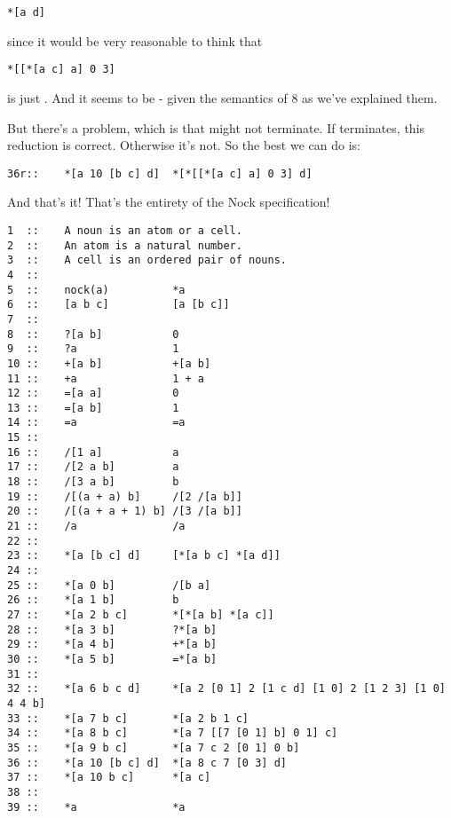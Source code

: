 \begin{framed_shaded}
\begin{Verbatim}[fontsize=\relsize{-2.5},fontseries=b,commandchars=\\\{\}]
*[a d]
\end{Verbatim}
\end{framed_shaded}
since it would be very reasonable to think that

\begin{framed_shaded}
\begin{Verbatim}[fontsize=\relsize{-2.5},fontseries=b,commandchars=\\\{\}]
*[[*[a c] a] 0 3]
\end{Verbatim}
\end{framed_shaded}

is just .  And it seems to be - given the semantics of 8 as
we've explained them.

But there's a problem, which is that  might not terminate.
If  terminates, this reduction is correct.  Otherwise it's not. 
So the best we can do is:

\begin{framed_shaded}
\begin{Verbatim}[fontsize=\relsize{-2.5},fontseries=b,commandchars=\\\{\}]
36r::    *[a 10 [b c] d]  *[*[[*[a c] a] 0 3] d]
\end{Verbatim}
\end{framed_shaded}

And that's it! That's the entirety of the Nock specification! 

\begin{framed_shaded}
\begin{Verbatim}[fontsize=\relsize{-2.5},fontseries=b,commandchars=\\\{\}]
1  ::    A noun is an atom or a cell.
2  ::    An atom is a natural number.
3  ::    A cell is an ordered pair of nouns.
4  ::
5  ::    nock(a)          *a
6  ::    [a b c]          [a [b c]]
7  ::
8  ::    ?[a b]           0
9  ::    ?a               1
10 ::    +[a b]           +[a b]
11 ::    +a               1 + a
12 ::    =[a a]           0
13 ::    =[a b]           1
14 ::    =a               =a
15 ::
16 ::    /[1 a]           a
17 ::    /[2 a b]         a
18 ::    /[3 a b]         b
19 ::    /[(a + a) b]     /[2 /[a b]]
20 ::    /[(a + a + 1) b] /[3 /[a b]]
21 ::    /a               /a
22 ::
23 ::    *[a [b c] d]     [*[a b c] *[a d]]
24 ::
25 ::    *[a 0 b]         /[b a]
26 ::    *[a 1 b]         b
27 ::    *[a 2 b c]       *[*[a b] *[a c]]
28 ::    *[a 3 b]         ?*[a b]
29 ::    *[a 4 b]         +*[a b]
30 ::    *[a 5 b]         =*[a b]
31 ::
32 ::    *[a 6 b c d]     *[a 2 [0 1] 2 [1 c d] [1 0] 2 [1 2 3] [1 0] 4 4 b]
33 ::    *[a 7 b c]       *[a 2 b 1 c]
34 ::    *[a 8 b c]       *[a 7 [[7 [0 1] b] 0 1] c]
35 ::    *[a 9 b c]       *[a 7 c 2 [0 1] 0 b]
36 ::    *[a 10 [b c] d]  *[a 8 c 7 [0 3] d]
37 ::    *[a 10 b c]      *[a c]
38 ::
39 ::    *a               *a
\end{Verbatim}
\end{framed_shaded}